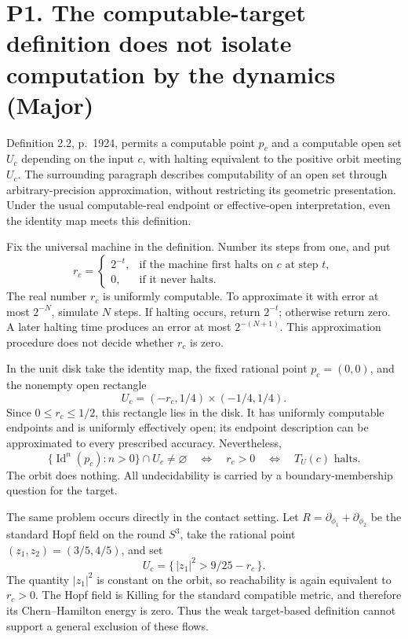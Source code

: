 \documentclass[10pt]{article}
\begin{document}
\section*{P1. The computable-target definition does not isolate computation by the dynamics (Major)}
Definition 2.2, p. 1924, permits a computable point \(p_c\) and a computable open set \(U_c\) depending on the input \(c\), with halting equivalent to the positive orbit meeting \(U_c\). The surrounding paragraph describes computability of an open set through arbitrary-precision approximation, without restricting its geometric presentation. Under the usual computable-real endpoint or effective-open interpretation, even the identity map meets this definition.\par
Fix the universal machine in the definition. Number its steps from one, and put \[r_c=
 \begin{cases}
  2^{-t},&\textstyle\text{if the machine first halts on }c\text{ at step }t,\\
  0,&\textstyle\text{if it never halts}.
 \end{cases}\] The real number \(r_c\) is uniformly computable. To approximate it with error at most \(2^{-N}\), simulate \(N\) steps. If halting occurs, return \(2^{-t}\); otherwise return zero. A later halting time produces an error at most \(2^{-(N+1)}\). This approximation procedure does not decide whether \(r_c\) is zero.\par
In the unit disk take the identity map, the fixed rational point \(p_c=(0,0)\), and the nonempty open rectangle \[U_c=(-r_c,1/4)\times(-1/4,1/4).\] Since \(0\leq r_c\leq1/2\), this rectangle lies in the disk. It has uniformly computable endpoints and is uniformly effectively open; its endpoint description can be approximated to every prescribed accuracy. Nevertheless, \[\{\operatorname{Id}^n(p_c):n>0\}\cap U_c\ne\varnothing
 \quad\Longleftrightarrow\quad r_c>0
 \quad\Longleftrightarrow\quad T_U(c)\text{ halts}.\] The orbit does nothing. All undecidability is carried by a boundary-membership question for the target.\par
The same problem occurs directly in the contact setting. Let \(R=\partial_{\phi_1}+\partial_{\phi_2}\) be the standard Hopf field on the round \(S^3\), take the rational point \((z_1,z_2)=(3/5,4/5)\), and set \[U_c=\{\,|z_1|^2>9/25-r_c\,\}.\] The quantity \(|z_1|^2\) is constant on the orbit, so reachability is again equivalent to \(r_c>0\). The Hopf field is Killing for the standard compatible metric, and therefore its Chern–Hamilton energy is zero. Thus the weak target-based definition cannot support a general exclusion of these flows.\par
\end{document}
